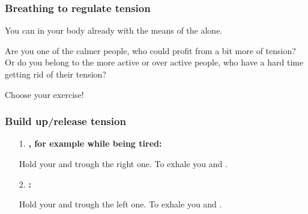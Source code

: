 \begin{frame}
\frametitle{Breathing to regulate tension}

 

You can  in your body already with the means of the  alone. 

Are you one of the calmer people, who could profit from a bit more of tension? Or do you belong to the more active or over active people, who have a hard time getting rid of their tension?

Choose your exercise!

\end{frame}


\begin{frame}
\frametitle{Build up/release tension}

 
\begin{itemize}
\item[1. ] \textbf{, for example while being tired:}

Hold your  and  trough the right one. To exhale you  and .
\item [2. ] \textbf{:}

Hold your  and  trough the left one. To exhale you  and .
\end{itemize}
\end{frame}

